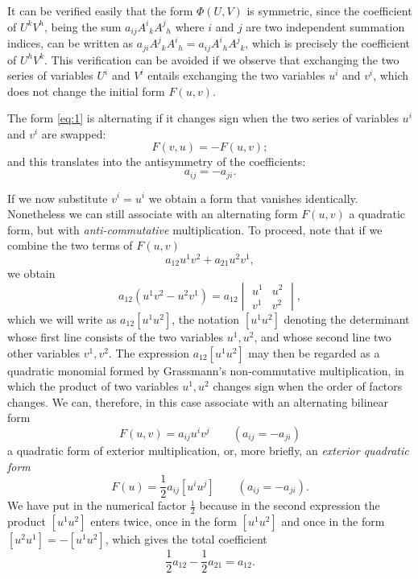 It can be verified easily that the form $\Phi(U,V)$ is symmetric, since the coefficient of $U^{k}V^{h}$, being the sum $a_{ij}A^{i}{}_{k}A^{j}{}_{h}$ where $i$ and $j$ are two independent summation indices, can be written as $a_{ji}A^{j}{}_{k}A^{i}{}_{h}=a_{ij}A^{i}{}_{h}A^{j}{}_{k}$, which is precisely the coefficient of $U^{h}V^{k}$. This verification can be avoided if we observe that exchanging the two series of variables $U^{i}$ and $V^{i}$ entails exchanging the two variables $u^{i}$ and $v^{i}$, which does not change the initial form $F(u,v)$.

\vspace{12pt}\fsec The form \eqref{eq:1} is  alternating  if it changes sign when the two series of variables $u^{i}$ and $v^{i}$ are swapped:
\[
F(v,u)=-F(u,v);
\]
and this translates into the antisymmetry of the coefficients:
\[
a_{ij}=-a_{ji}.
\]

If we now substitute $v^{i}=u^{i}$ we obtain a form that vanishes identically. Nonetheless we can still associate with an alternating form $F(u,v)$ a quadratic form,  but with \emph{anti-commutative} multiplication. To proceed, note that if we combine the two terms of $F(u,v)$
\[
a_{12}u^{1}v^{2}+a_{21}u^{2}v^{1},
\]
we obtain
\[
a_{12}(u^{1}v^{2}-u^{2}v^{1})=a_{12}
\begin{vmatrix}
  u^{1}&u^{2}\\
  v^{1}&v^{2}
\end{vmatrix}
,
\]
which we will write as $a_{12}[u^{1}u^{2}]$, the notation $[u^{1}u^{2}]$ denoting the determinant whose first line consists of the two variables $u^{1}, u^{2}$, and whose second line two other variables $v^{1}, v^{2}$. The expression $a_{12}[u^{1}u^{2}]$ may then  be regarded as a quadratic monomial formed by Grassmann's non-commutative multiplication, in which the product of two variables $u^{1}, u^{2}$ changes sign when the order of factors changes. We can, therefore, in this case associate with an alternating bilinear form
\[
F(u,v)=a_{ij}u^{i}v^{j}\qquad(a_{ij}=-a_{ji})
\]
a quadratic form of exterior multiplication, or, more briefly, an \emph{exterior quadratic form} 
\[
F(u)=\frac{1}{2}a_{ij}[u^{i}u^{j}]\qquad(a_{ij}=-a_{ji}).
\]
We have put in the numerical factor $\frac{1}{2}$ because in the second expression the product $[u^{1}u^{2}]$ enters twice, once in the form $[u^{1}u^{2}]$ and once in the form $[u^{2}u^{1}]=-[u^{1}u^{2}]$, which gives the total coefficient
\[
\frac{1}{2}a_{12}-\frac{1}{2}a_{21}=a_{12}.
\]

